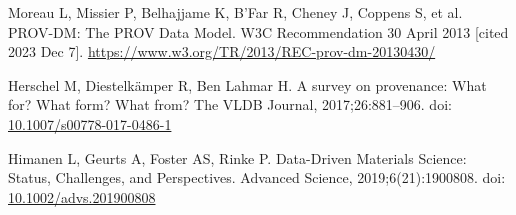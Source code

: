 \documentclass[10pt,letterpaper]{article}
\begin{document}
%
%
% 
\begin{thebibliography}{10}

\setlength{\parskip}{6pt}
\setlength{\itemsep}{0pt plus 0.3ex}


\begin{small}










Moreau L, Missier P, Belhajjame K, B'Far R, Cheney J, Coppens S, et al.
PROV-DM: The PROV Data Model. W3C Recommendation 30 April 2013 [cited 2023 Dec 7].
\url{https://www.w3.org/TR/2013/REC-prov-dm-20130430/}

Herschel M, Diestelkämper R, Ben Lahmar H.
A survey on provenance: What for? What form? What from?
The VLDB Journal, 2017;26:881--906.
doi: \href{https://doi.org/10.1007/s00778-017-0486-1}{10.1007/s00778-017-0486-1}

Himanen L, Geurts A, Foster AS, Rinke P.
Data-Driven Materials Science: Status, Challenges, and Perspectives.
Advanced Science, 2019;6(21):1900808.
doi: \href{https://doi.org/10.1002/advs.201900808}{10.1002/advs.201900808}


\end{small}
\end{thebibliography}
\end{document}
